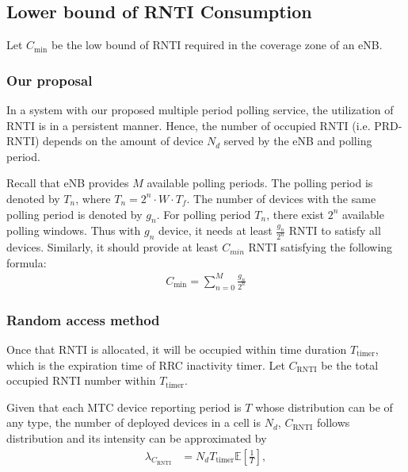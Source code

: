 \subsection{Lower bound of RNTI Consumption}
\label{sec:lower_bound_rnti}
Let $C_{\text{min}}$ be the low bound of RNTI required in the coverage zone of an eNB.

\subsubsection{Our proposal}
In a system with our proposed multiple period polling service, the utilization of RNTI is in a persistent manner. Hence, the number of occupied RNTI (i.e. PRD-RNTI) depends on the amount of device $N_d$ served by the eNB and polling period. 

Recall that eNB provides $M$ available polling periods. The polling period is denoted by $T_{n}$, where $T_n = 2^n \cdot W \cdot T_f$. The number of devices with the same polling period is denoted by $g_{n}$. For polling period $T_n$, there exist $2^n$ available polling windows. Thus with $g_n$ device, it needs at least $\frac{g_n}{2^n}$ RNTI to satisfy all devices. Similarly, it should provide at least $C_{min}$ RNTI satisfying the following formula:  
\begin{align}	
 C_{\text{min}} = \sum_{n=0}^{M} \frac{g_n}{2^n} \label{eq:lower-bound}
\end{align}

\subsubsection{Random access method}
Once that RNTI is allocated, it will be occupied within time duration $T_{\text{timer}}$, which is the expiration time of RRC inactivity timer. Let $C_{\text{RNTI}}$ be the total occupied RNTI number within $T_{\text{timer}}$.

\begin{lemma}
	Given that each MTC device reporting period is $T$ whose distribution can be of any type, the number of deployed devices in a cell is $N_d$, $C_{\text{RNTI}}$ follows distribution and its intensity can be approximated by 
	\begin{align}
		\lambda_{C_{\text{RNTI}}}  &= N_{d} T_{\text{timer}} \mathbb{E} \left[ \frac{1}{T} \right],
	\end{align}
\end{lemma}

